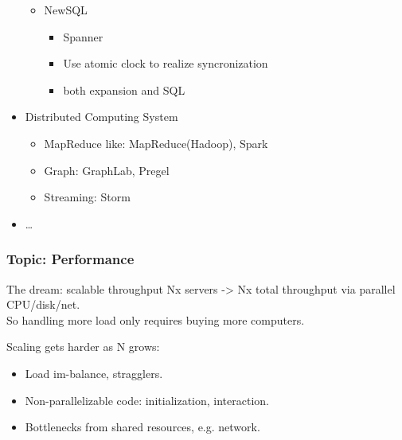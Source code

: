 \begin{frame}[allowframebreaks]
\begin{itemize}
\begin{itemize}
\begin{itemize}
            \end{itemize}
            \item NewSQL
            \begin{itemize}
                \item Spanner
                \item Use atomic clock to realize syncronization
                \item both expansion and SQL
            \end{itemize}
        \end{itemize}
        \item Distributed Computing System
        \begin{itemize}
            \item MapReduce like: MapReduce(Hadoop), Spark
            \item Graph: GraphLab, Pregel
            \item Streaming: Storm
        \end{itemize}
        \item \ldots
    \end{itemize}
\end{frame}

\begin{frame}
    \frametitle{Topic: Performance}
    \begin{block}{The dream: scalable throughput}
        Nx servers -> Nx total throughput via parallel CPU/disk/net. \\
        So handling more load only requires buying more computers.
    \end{block}
    Scaling gets harder as N grows:
    \begin{itemize}
        \item Load im-balance, stragglers.
        \item Non-parallelizable code: initialization, interaction.
        \item Bottlenecks from shared resources, e.g. network.
    \end{itemize}
\end{frame}

